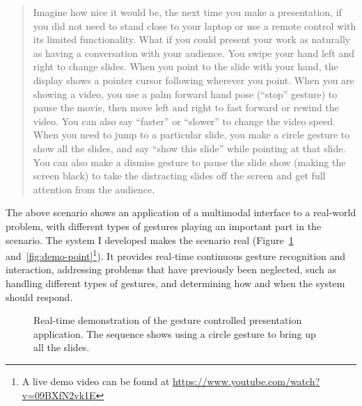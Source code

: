 \begin{quotation}
Imagine how nice it would be, the next time you make a presentation, if you did
not need to stand close to your laptop or use a remote control with its limited
functionality. What if you could present your work as naturally as having a
conversation with your audience. You swipe your hand left and right to change
slides. When you point to the slide with your hand, the display shows a pointer
cursor following wherever you point. When you are showing a video, you use a
palm forward hand pose (``stop'' gesture) to pause the movie, then move left and
right to fast forward or rewind the video. You can also say ``faster'' or
``slower'' to change the video speed. When you need to jump to a particular
slide, you make a circle gesture to show all the slides, and say ``show this
slide'' while pointing at that slide. You can also make a dismiss gesture to pause the slide show (making the screen black) to take the distracting slides off the screen and get full attention from the audience.
\end{quotation}

The above scenario shows an application of a multimodal interface to a
real-world problem, with different types of gestures playing an important part
in the scenario. The system I developed makes the scenario real
(Figure~\ref{fig:demo-circle}
and~\ref{fig:demo-point}\footnote{A live demo video can be found at
\url{https://www.youtube.com/watch?v=09BXfN2vk1E}}).
It provides real-time continuous gesture recognition and interaction, addressing problems that have previously been neglected, such as handling different types of gestures, and determining how and when the system should respond.

\begin{figure}[tbh]
\centering
\hspace{-0.6em}
\caption{Real-time demonstration of the gesture controlled presentation
application. The sequence shows using a circle gesture to bring up all the
slides.}
\label{fig:demo-circle}
\end{figure}

